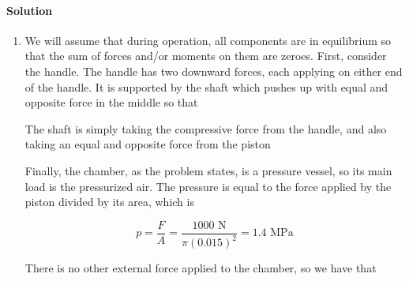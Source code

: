 \documentclass[
10pt,
a4paper,
openany,
svgnames,
]{book}
\begin{document}
\paragraph{Solution}

\begin{enumerate}
\item We will assume that during operation, all components are in equilibrium so that the sum of forces and/or moments on them are zeroes. First, consider the handle.
  The handle has two downward forces, each applying on either end of the handle. It is supported by the shaft which pushes up with equal and opposite force in the middle so that
  
  \begin{figure}[h]
    \centering
  \end{figure}
  
  The shaft is simply taking the compressive force from the handle, and also taking an equal and opposite force from the piston

   \begin{figure}[h]
    \centering
  \end{figure}
  
  Finally, the chamber, as the problem states, is a pressure vessel, so its main load is the pressurized air. The pressure is equal to the force applied by the piston divided by its area, which is

\[p = \frac{F}{A} = \frac{1000 \text{ N}}{\pi (0.015)^2} = 1.4 \text{ MPa}\]

  There is no other external force applied to the chamber, so we have that

  \begin{figure}[h]
    \centering
  \end{figure}


\end{enumerate}
\end{document}
